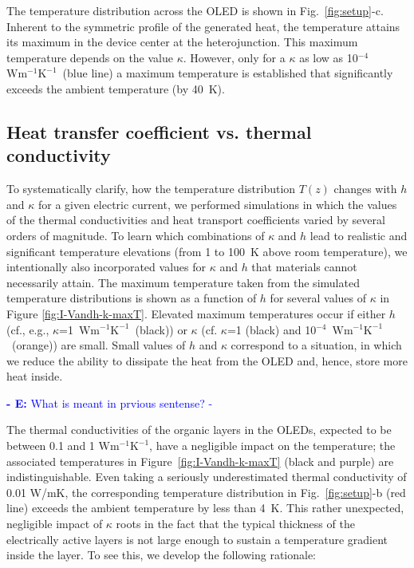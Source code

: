\documentclass[%
9pt,
 aip,
rsi,%
 amsmath,amssymb,
preprint,%
]{revtex4-1}
\newcommand{\InTextComment}[2]{
 	\textcolor{blue}{\textsf{{\footnotesize \textbf{- #1:} #2 -}}}\newline
 }
\renewcommand{\baselinestretch}{1.2}
\newcommand{\thermalconductivity}{$\mathrm{W m^{-1} K^{-1}}$}
\begin{document}
The temperature distribution across the OLED is shown in Fig.~\ref{fig:setup}-c. Inherent to the symmetric profile of the generated heat, the temperature attains its maximum in the device center at the heterojunction. This maximum temperature depends on the value $\kappa$. However, only for a $\kappa$ as low as 10$^{-4}$~\thermalconductivity~(blue line) a maximum temperature is established that significantly exceeds the ambient temperature (by 40~K).   

\subsection{Heat transfer coefficient vs. thermal conductivity}
To systematically clarify, how the temperature distribution $T(z)$ changes with $h$ and $\kappa$ for a given electric current, we performed simulations in which the values of the thermal conductivities and heat transport coefficients varied by several orders of magnitude. 
To learn which combinations of $\kappa$ and $h$ lead to realistic and significant temperature elevations (from 1 to 100~K above room temperature), we intentionally also incorporated values for $\kappa$ and $h$ that materials cannot necessarily attain.
The maximum temperature taken from the simulated temperature distributions is shown as a function of $h$ for several values of $\kappa$ in Figure \ref{fig:I-Vandh-k-maxT}. 
Elevated maximum temperatures occur if either $h$ (cf., e.g., $\kappa$=1~\thermalconductivity~(black)) or $\kappa$ (cf. $\kappa$=1 (black) and 10$^{-4}$~\thermalconductivity~(orange)) are small. Small values of $h$ and $\kappa$ correspond to a situation, in which we reduce the ability to dissipate the heat from the OLED and, hence, store more heat inside.
\InTextComment{E}{What is meant in prvious sentense?}
The thermal conductivities of the organic layers in the OLEDs, expected to be between 0.1 and 1 \thermalconductivity, have a negligible impact on the temperature; the associated temperatures in Figure~\ref{fig:I-Vandh-k-maxT} (black and purple) are indistinguishable.
Even taking a seriously underestimated thermal conductivity of 0.01 W/mK, the corresponding temperature distribution in Fig.~\ref{fig:setup}-b (red line) exceeds the ambient temperature by less than 4~K. 
This rather unexpected, negligible impact of $\kappa$ roots in the fact that the typical thickness of the electrically active layers is not large enough to sustain a temperature gradient inside the layer. To see this, we develop the following rationale: 
\end{document}

